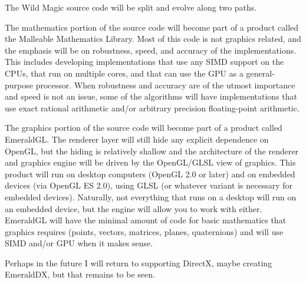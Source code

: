 \documentclass{article}
\begin{document}
The Wild Magic source code will be split and evolve along two paths.

The mathematics portion of the source code will become part of a product
called the Malleable Mathematics Library.  Most of this code is not graphics
related, and the emphasis will be on robustness, speed, and accuracy of the
implementations.  This includes developing implementations that use any
SIMD support on the CPUs, that run on multiple cores, and that can use the
GPU as a general-purpose processor.  When robustness and accuracy are of the
utmost importance and speed is not an issue, some of the algorithms will
have implementations that use exact rational arithmetic and/or arbitrary
precision floating-point arithmetic.

The graphics portion of the source code will become part of a product called
EmeraldGL.  The renderer layer will still hide any explicit dependence on
OpenGL, but the hiding is relatively shallow and the architecture of the
renderer and graphics engine will be driven by the OpenGL/GLSL view of graphics.
This product will run on desktop computers (OpenGL 2.0 or later) and on
embedded devices (via OpenGL ES 2.0), using GLSL (or whatever variant
is necessary for embedded devices).  Naturally, not everything that runs
on a desktop will run on an embedded device, but the engine will allow you
to work with either.  EmeraldGL will have the minimal amount of code for
basic mathematics that graphics requires (points, vectors, matrices, planes,
quaternions) and will use SIMD and/or GPU when it makes sense.

Perhaps in the future I will return to supporting DirectX, maybe
creating EmeraldDX, but that remains to be seen.
\end{document}

